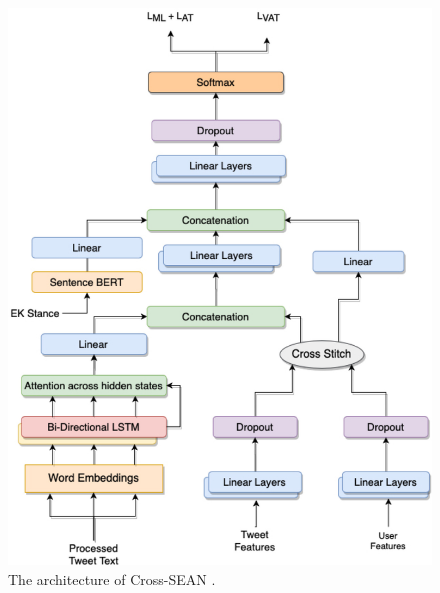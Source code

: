 \begin{figure}
    \centering
    \includegraphics[width=1\linewidth]{img/Cross-SEAN.jpg}
    \caption{The architecture of Cross-SEAN \cite{b6}.}
    \label{fig:Cross-SEAN.}
\end{figure}

